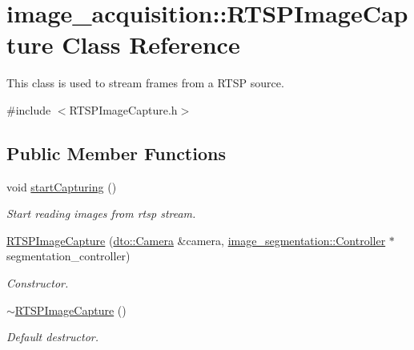 \hypertarget{classimage__acquisition_1_1_r_t_s_p_image_capture}{}\section{image\+\_\+acquisition\+:\+:R\+T\+S\+P\+Image\+Capture Class Reference}
\label{classimage__acquisition_1_1_r_t_s_p_image_capture}


This class is used to stream frames from a R\+T\+SP source.  




{\ttfamily \#include $<$R\+T\+S\+P\+Image\+Capture.\+h$>$}

\subsection*{Public Member Functions}
\begin{DoxyCompactItemize}
\item 
\mbox{\label{classimage__acquisition_1_1_r_t_s_p_image_capture_a57feb60e003a800cc9ab8066b6f01281}} 
void \mbox{\hyperlink{classimage__acquisition_1_1_r_t_s_p_image_capture_a57feb60e003a800cc9ab8066b6f01281}{start\+Capturing}} ()
\begin{DoxyCompactList}\small\item\em Start reading images from rtsp stream. \end{DoxyCompactList}\item 
\mbox{\label{classimage__acquisition_1_1_r_t_s_p_image_capture_a39a6e4f49ba12d09be240186cfd3d39b}} 
\mbox{\hyperlink{classimage__acquisition_1_1_r_t_s_p_image_capture_a39a6e4f49ba12d09be240186cfd3d39b}{R\+T\+S\+P\+Image\+Capture}} (\mbox{\hyperlink{structdto_1_1_camera}{dto\+::\+Camera}} \&camera, \mbox{\hyperlink{classimage__segmentation_1_1_controller}{image\+\_\+segmentation\+::\+Controller}} $\ast$segmentation\+\_\+controller)
\begin{DoxyCompactList}\small\item\em Constructor. \end{DoxyCompactList}\item 
\mbox{\label{classimage__acquisition_1_1_r_t_s_p_image_capture_a46e1a01cc14eed588661c4d1162e1021}} 
\mbox{\hyperlink{classimage__acquisition_1_1_r_t_s_p_image_capture_a46e1a01cc14eed588661c4d1162e1021}{$\sim$\+R\+T\+S\+P\+Image\+Capture}} ()
\begin{DoxyCompactList}\small\item\em Default destructor. \end{DoxyCompactList}\end{DoxyCompactItemize}


